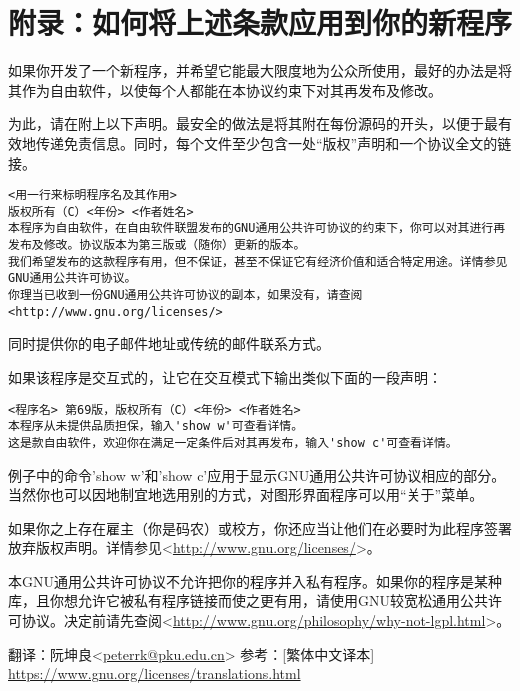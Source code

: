 \section{附录：如何将上述条款应用到你的新程序}
如果你开发了一个新程序，并希望它能最大限度地为公众所使用，最好的办法是将其作为自由软件，以使每个人都能在本协议约束下对其再发布及修改。\par
为此，请在附上以下声明。最安全的做法是将其附在每份源码的开头，以便于最有效地传递免责信息。同时，每个文件至少包含一处“版权”声明和一个协议全文的链接。
\begin{verbatim}
<用一行来标明程序名及其作用>
版权所有（C）<年份> <作者姓名>
本程序为自由软件，在自由软件联盟发布的GNU通用公共许可协议的约束下，你可以对其进行再发布及修改。协议版本为第三版或（随你）更新的版本。
我们希望发布的这款程序有用，但不保证，甚至不保证它有经济价值和适合特定用途。详情参见GNU通用公共许可协议。
你理当已收到一份GNU通用公共许可协议的副本，如果没有，请查阅
<http://www.gnu.org/licenses/>
\end{verbatim}\par
同时提供你的电子邮件地址或传统的邮件联系方式。\par
如果该程序是交互式的，让它在交互模式下输出类似下面的一段声明：
\begin{verbatim}
<程序名> 第69版，版权所有（C）<年份> <作者姓名>
本程序从未提供品质担保，输入'show w'可查看详情。
这是款自由软件，欢迎你在满足一定条件后对其再发布，输入'show c'可查看详情。
\end{verbatim}\par
例子中的命令'show w'和'show c'应用于显示GNU通用公共许可协议相应的部分。当然你也可以因地制宜地选用别的方式，对图形界面程序可以用“关于”菜单。\par
如果你之上存在雇主（你是码农）或校方，你还应当让他们在必要时为此程序签署放弃版权声明。详情参见<\url{http://www.gnu.org/licenses/}>。\par
本GNU通用公共许可协议不允许把你的程序并入私有程序。如果你的程序是某种库，且你想允许它被私有程序链接而使之更有用，请使用GNU较宽松通用公共许可协议。决定前请先查阅<\url{http://www.gnu.org/philosophy/why-not-lgpl.html}>。\par
翻译：阮坤良<\url{peterrk@pku.edu.cn}>
参考：[繁体中文译本] \url{https://www.gnu.org/licenses/translations.html}
